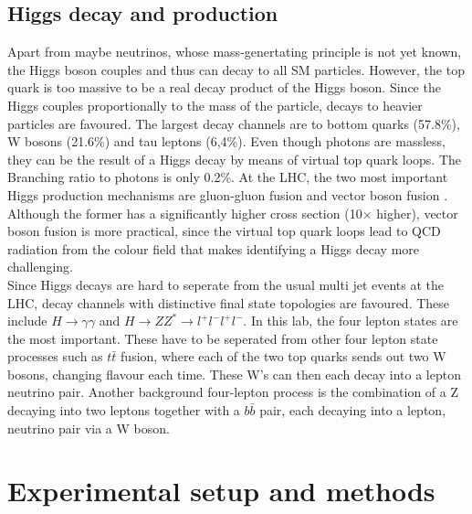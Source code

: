 \documentclass[twoside,        %
               BCOR12mm,       %
               ngerman,english, %
               fleqn,headsepline=false,footsepline=false
              ]{Vorlage/MFPREPORT}
\begin{document}
\subsection{Higgs decay and production}
Apart from maybe neutrinos, whose mass-genertating principle is not yet known,
the Higgs boson couples and thus can decay to all SM particles. However, the
top quark is too massive to be a real decay product of the Higgs boson. Since
the Higgs couples proportionally to the mass of the particle, decays to heavier
particles are favoured. The largest decay channels are to bottom quarks
(57.8\%), W bosons (21.6\%) and tau leptons (6,4\%). Even though photons are
massless, they can be the result of a Higgs decay by means of virtual top quark
loops. The Branching ratio to photons is only 0.2\%.
At the LHC, the two most important Higgs production mechanisms are gluon-gluon
fusion and vector boson fusion \cite[p.\;490f]{thomson}. Although the former
has a significantly higher cross section (10$\times$ higher), vector boson fusion is more
practical, since the virtual top quark loops lead to QCD radiation from the
colour field that makes identifying a Higgs decay more challenging.\\
Since Higgs decays are hard to seperate from the usual multi jet events at the
LHC, decay channels with distinctive final state topologies are favoured. These
include $H\rightarrow\gamma\gamma$ and $H\rightarrow ZZ^*\rightarrow
l^+l^-l^+l^-$. In this lab, the four lepton states are the most important. 
These have to be seperated from other four lepton state processes such as
$t\bar t$ fusion, where each of the two top quarks sends out two W bosons, changing
flavour each time. These W's can then each decay into a lepton neutrino pair.
Another background four-lepton process is the combination of a Z decaying into
two leptons together with a $b\bar b$ pair, each decaying into a lepton,
neutrino pair via a W boson.




\section{Experimental setup and methods}
\label{sec:setup}
\end{document}
